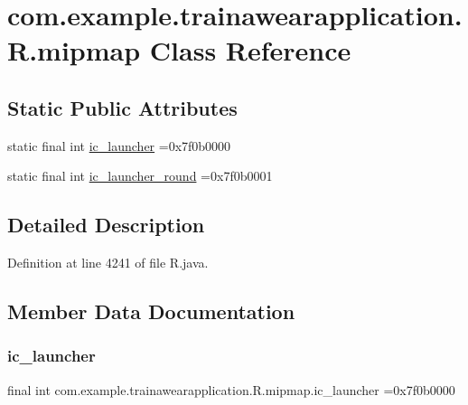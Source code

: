 \hypertarget{classcom_1_1example_1_1trainawearapplication_1_1_r_1_1mipmap}{}\section{com.\+example.\+trainawearapplication.\+R.\+mipmap Class Reference}
\label{classcom_1_1example_1_1trainawearapplication_1_1_r_1_1mipmap}
\subsection*{Static Public Attributes}
\begin{DoxyCompactItemize}
\item 
static final int \mbox{\hyperlink{classcom_1_1example_1_1trainawearapplication_1_1_r_1_1mipmap_a926f8b2f7e4512ba5c7791ce7b544193}{ic\+\_\+launcher}} =0x7f0b0000
\item 
static final int \mbox{\hyperlink{classcom_1_1example_1_1trainawearapplication_1_1_r_1_1mipmap_a9fa53e4ffcc464ff3e40e922985284cc}{ic\+\_\+launcher\+\_\+round}} =0x7f0b0001
\end{DoxyCompactItemize}


\subsection{Detailed Description}


Definition at line 4241 of file R.\+java.



\subsection{Member Data Documentation}
\mbox{\label{classcom_1_1example_1_1trainawearapplication_1_1_r_1_1mipmap_a926f8b2f7e4512ba5c7791ce7b544193}} 
\subsubsection{\texorpdfstring{ic\_launcher}{ic\_launcher}}
{\footnotesize\ttfamily final int com.\+example.\+trainawearapplication.\+R.\+mipmap.\+ic\+\_\+launcher =0x7f0b0000\hspace{0.3cm}{\ttfamily [static]}}



